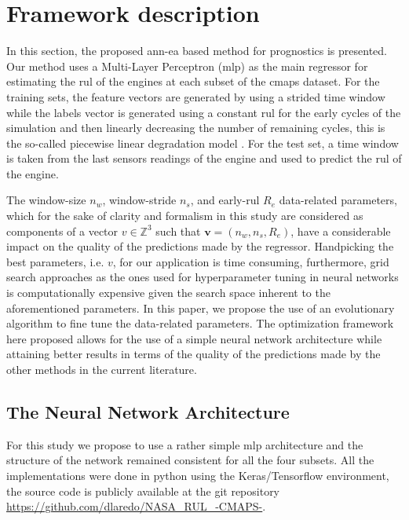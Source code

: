 \section{Framework description}
\label{sec:method}

In this section, the proposed \gls{ann}-\gls{ea} based method for prognostics is presented. Our method uses a Multi-Layer Perceptron (\gls{mlp}) as the main regressor for estimating the \gls{rul} of the engines at each subset of the \gls{cmaps} dataset. For the training sets, the feature vectors are generated by using a strided time window while the labels vector is generated using a constant \gls{rul} for the early cycles of the simulation and then linearly decreasing the number of remaining cycles, this is the so-called piecewise linear degradation model \cite{Ramasso2014}. For the test set, a time window is taken from the last sensors readings of the engine and used to predict the \gls{rul} of the engine.

The window-size $n_w$, window-stride $n_s$, and early-\gls{rul} $R_e$ data-related parameters, which for the sake of clarity and formalism in this study are considered as components of a vector $v \in \mathbb{Z}^3$ such that $\mathbf{v} = (n_w, n_s, R_e)$, have a considerable impact on the quality of the predictions made by the regressor. Handpicking the best parameters, i.e. $v$, for our application is time consuming, furthermore, grid search approaches as the ones used for hyperparameter tuning in neural networks is computationally expensive given the search space inherent to the aforementioned parameters. In this paper, we propose the use of an evolutionary algorithm to fine tune the data-related parameters. The optimization framework here proposed allows for the use of a simple neural network architecture while attaining better results in terms of the quality of the predictions made by the other methods in the current literature.

\subsection{The Neural Network Architecture}

For this study we propose to use a rather simple \gls{mlp} architecture and the structure of the network remained consistent for all the four subsets. All the implementations were done in python using the Keras/Tensorflow environment, the source code is publicly available at the git repository \url{https://github.com/dlaredo/NASA_RUL_-CMAPS-}. 


